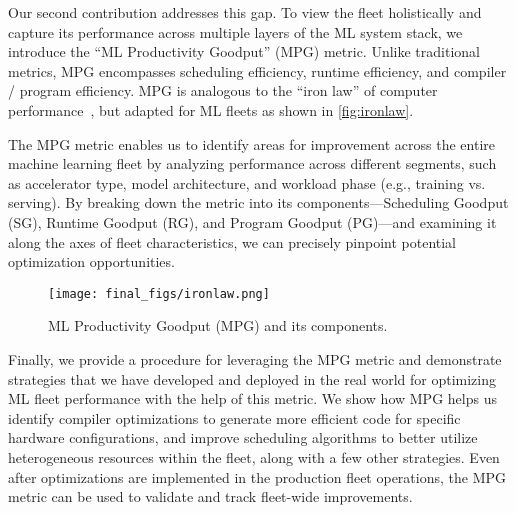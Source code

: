  Our second contribution addresses this gap. To view the fleet holistically and capture its performance across multiple layers of the ML system stack, we introduce the ``ML Productivity Goodput'' (MPG) metric. Unlike traditional metrics, MPG encompasses scheduling efficiency, runtime efficiency, and compiler / program efficiency. MPG is analogous to the ``iron law'' of computer performance~\cite{eeckhout2010computer}, but adapted for ML fleets as shown in \autoref{fig:ironlaw}.

The MPG metric enables us to identify areas for improvement across the entire machine learning fleet by analyzing performance across different segments, such as accelerator type, model architecture, and workload phase (e.g., training vs. serving). By breaking down the metric into its components---Scheduling Goodput (SG), Runtime Goodput (RG), and Program Goodput (PG)---and examining it along the axes of fleet characteristics, we can precisely pinpoint potential optimization opportunities.








\begin{figure}[t]
    \centering
    \vspace{.5em}
    \texttt{[image: final\_figs/ironlaw.png]}
    \caption{ML Productivity Goodput (MPG) and its components.%
    }
    \vspace*{-1em}
    \label{fig:ironlaw}
\end{figure}



 Finally, we provide a procedure for leveraging the MPG metric and demonstrate strategies that we have developed and deployed in the real world for optimizing ML fleet performance with the help of this metric. We show how MPG helps us identify compiler optimizations to generate more efficient code for specific hardware configurations, and improve scheduling algorithms to better utilize heterogeneous resources within the fleet, along with a few other strategies. Even after optimizations are implemented in the production fleet operations, the MPG metric can be used to validate and track fleet-wide improvements.



